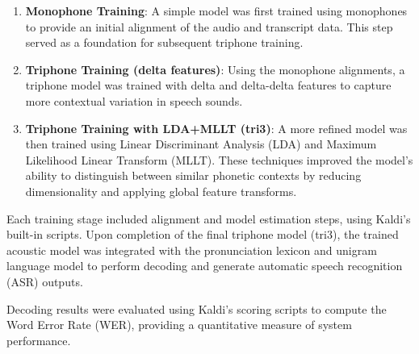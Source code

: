 \begin{enumerate}
    \item \textbf{Monophone Training}: A simple model was first trained using monophones to provide an initial alignment of the audio and transcript data. This step served as a foundation for subsequent triphone training.
    
    \item \textbf{Triphone Training (delta features)}: Using the monophone alignments, a triphone model was trained with delta and delta-delta features to capture more contextual variation in speech sounds.
    
    \item \textbf{Triphone Training with LDA+MLLT (tri3)}: A more refined model was then trained using Linear Discriminant Analysis (LDA) and Maximum Likelihood Linear Transform (MLLT). These techniques improved the model’s ability to distinguish between similar phonetic contexts by reducing dimensionality and applying global feature transforms.
\end{enumerate}

Each training stage included alignment and model estimation steps, using Kaldi’s built-in scripts. Upon completion of the final triphone model (tri3), the trained acoustic model was integrated with the pronunciation lexicon and unigram language model to perform decoding and generate automatic speech recognition (ASR) outputs.

Decoding results were evaluated using Kaldi’s scoring scripts to compute the Word Error Rate (WER), providing a quantitative measure of system performance.


